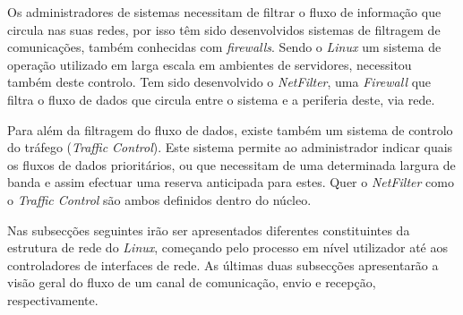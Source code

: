 Os administradores de sistemas necessitam de filtrar o fluxo de informação que circula nas suas redes, por isso têm sido desenvolvidos sistemas de filtragem de comunicações, também conhecidas com \textit{firewalls}.
Sendo o \textit{Linux} um sistema de operação utilizado em larga escala em ambientes de servidores, necessitou também deste controlo. Tem sido desenvolvido o \textit{NetFilter}, uma \textit{Firewall} que filtra o fluxo de dados que circula entre o sistema e a periferia deste, via rede.

Para além da filtragem do fluxo de dados, existe também um sistema de controlo do tráfego (\textit{Traffic Control}).
Este sistema permite ao administrador indicar quais os fluxos de dados prioritários, ou que necessitam de uma determinada largura de banda e assim efectuar uma reserva anticipada para estes.
Quer o \textit{NetFilter} como o \textit{Traffic Control} são ambos definidos dentro do núcleo.
 
Nas subsecções seguintes irão ser apresentados diferentes constituintes da estrutura de rede do \textit{Linux}, começando pelo processo em nível utilizador até aos controladores de interfaces de rede. As últimas duas subsecções apresentarão a visão geral do fluxo de um canal de comunicação, envio e recepção, respectivamente.



 
